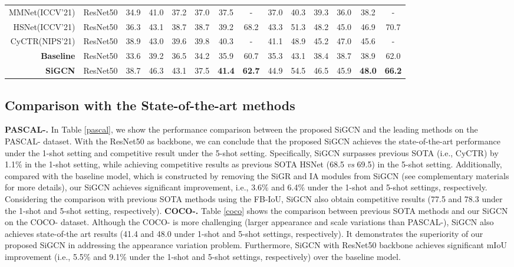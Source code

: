 \documentclass{bmvc2k}
\begin{document}
\begin{table*}[!t]
{\begin{tabular}{r|c|cccccc|cccccc}
MMNet(ICCV'21) \cite{wu2021learning}  & ResNet50 
& 34.9  & 41.0   & 37.2   & 37.0   & 37.5 & -  
& 37.0  & 40.3   & 39.3   & 36.0   & 38.2 & -     \\
HSNet(ICCV'21) \cite{min2021hypercorrelation} & ResNet50  
& 36.3  & 43.1   & 38.7   & 38.7   & 39.2 & 68.2  
& 43.3  & 51.3   & 48.2   & 45.0   & 46.9 & 70.7  \\
CyCTR(NIPS'21) \cite{zhang2021few} & ResNet50  
& 38.9  & 43.0   & 39.6   & 39.8   & 40.3 & -  
& 41.1  & 48.9   & 45.2   & 47.0   & 45.6 & -   \\ \hline
\textbf{Baseline} & ResNet50                    
& 33.6   & 39.2    & 36.5    & 34.2   & 35.9    & 60.7 
& 35.3   & 43.1    & 38.4    & 38.7   & 38.9    & 62.0        \\
\textbf{SiGCN} & ResNet50
& 38.7  & 46.3  & 43.1  & 37.5 & \textbf{41.4}  & \textbf{62.7}
& 44.9  & 54.5  & 46.5  & 45.9 & \textbf{48.0}  & \textbf{66.2} \\ 
\bottomrule[2pt]
\end{tabular}}
\vspace{-4mm}
\label{coco}
\end{table*} \subsection{Comparison with the State-of-the-art methods}
\textbf{PASCAL-.}
In Table \ref{pascal}, we show the performance comparison between the proposed SiGCN and the leading methods on the PASCAL- dataset. With the ResNet50 as backbone, we can conclude that the proposed SiGCN achieves the state-of-the-art performance under the 1-shot setting and competitive result under the 5-shot setting. Specifically, SiGCN surpasses previous SOTA (i.e., CyCTR) by 1.1\% in the 1-shot setting, while achieving competitive results as previous SOTA HSNet (68.5 \emph{vs} 69.5) in the 5-shot setting. Additionally, compared with the baseline model, which is constructed by removing the SiGR and IA modules from SiGCN (see complementary materials for more details), our SiGCN achieves significant improvement, i.e., 3.6\% and 6.4\% under the 1-shot and 5-shot settings, respectively. Considering the comparison with previous SOTA methods using the FB-IoU, SiGCN also obtain competitive results (77.5 and 78.3 under the 1-shot and 5-shot setting, respectively).
\textbf{COCO-.}
Table \ref{coco} shows the comparison between previous SOTA methods and our SiGCN on the COCO- dataset. Although the COCO- is more challenging (larger appearance and scale variations than PASCAL-), SiGCN also achieves state-of-the art results (41.4 and 48.0 under 1-shot and 5-shot settings, respectively). It demonstrates the superiority of our proposed SiGCN in addressing the appearance variation problem. Furthermore, SiGCN with ResNet50 backbone achieves significant mIoU improvement (i.e., 5.5\% and 9.1\% under the 1-shot and 5-shot settings, respectively) over the baseline model.\\
\end{document}
